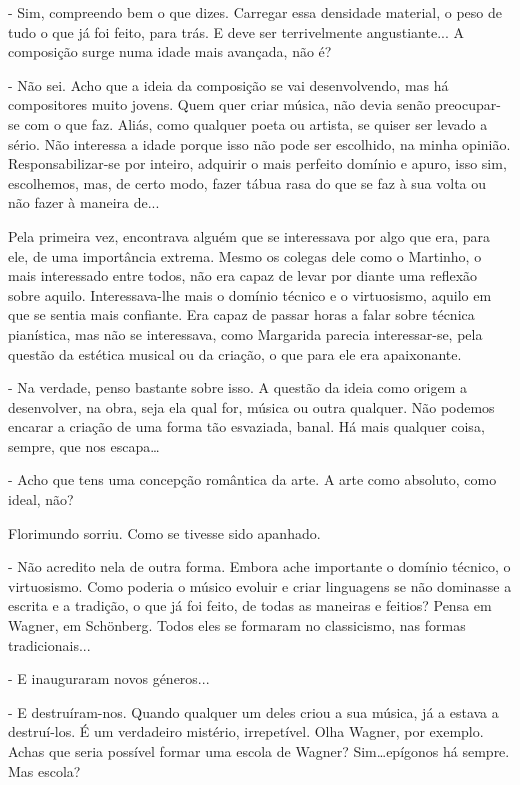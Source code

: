 - Sim, compreendo bem o que dizes. Carregar essa densidade material, o
peso de tudo o que já foi feito, para trás. E deve ser terrivelmente
angustiante... A composição surge numa idade mais avançada, não é?

- Não sei. Acho que a ideia da composição se vai desenvolvendo, mas há
compositores muito jovens. Quem quer criar música, não devia senão
preocupar-se com o que faz. Aliás, como qualquer poeta ou artista, se
quiser ser levado a sério. Não interessa a idade porque isso não pode
ser escolhido, na minha opinião. Responsabilizar-se por inteiro,
adquirir o mais perfeito domínio e apuro, isso sim, escolhemos, mas, de
certo modo, fazer tábua rasa do que se faz à sua volta ou não fazer à
maneira de...

Pela primeira vez, encontrava alguém que se interessava por algo que
era, para ele, de uma importância extrema. Mesmo os colegas dele como o
Martinho, o mais interessado entre todos, não era capaz de levar por
diante uma reflexão sobre aquilo. Interessava-lhe mais o domínio técnico
e o virtuosismo, aquilo em que se sentia mais confiante. Era capaz de
passar horas a falar sobre técnica pianística, mas não se interessava,
como Margarida parecia interessar-se, pela questão da estética musical
ou da criação, o que para ele era apaixonante.

- Na verdade, penso bastante sobre isso. A questão da ideia como origem
a desenvolver, na obra, seja ela qual for, música ou outra qualquer. Não
podemos encarar a criação de uma forma tão esvaziada, banal. Há mais
qualquer coisa, sempre, que nos escapa\ldots{}

- Acho que tens uma concepção romântica da arte. A arte como absoluto,
como ideal, não?

Florimundo sorriu. Como se tivesse sido apanhado.

- Não acredito nela de outra forma. Embora ache importante o domínio
técnico, o virtuosismo. Como poderia o músico evoluir e criar linguagens
se não dominasse a escrita e a tradição, o que já foi feito, de todas as
maneiras e feitios? Pensa em Wagner, em Schönberg. Todos eles se
formaram no classicismo, nas formas tradicionais...

- E inauguraram novos géneros...

- E destruíram-nos. Quando qualquer um deles criou a sua música, já a
estava a destruí-los. É um verdadeiro mistério, irrepetível. Olha
Wagner, por exemplo. Achas que seria possível formar uma escola de
Wagner? Sim\ldots{}epígonos há sempre. Mas escola?

